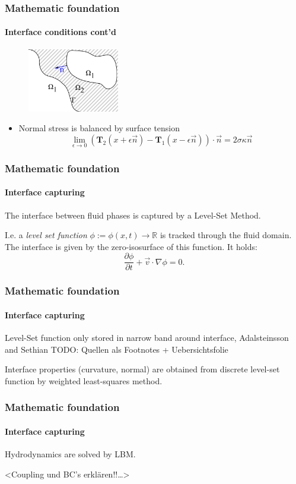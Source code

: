 \documentclass[ucs]{beamer}
\begin{document}
\begin{frame}
\frametitle{Mathematic foundation}
\framesubtitle{Interface conditions cont'd}
\begin{figure}[h!]
\includegraphics[width=4cm]{skizze.png}
\end{figure}
\begin{itemize}
\item<1->Normal stress is balanced by surface tension
  $$\lim_{\epsilon \to 0}(\textbf{T}_2(x+\epsilon \vec n) - \textbf{T}_1(x-\epsilon \vec n)) \cdot \vec n= 2\sigma \kappa \vec n$$
\end{itemize}
\vspace{-.5cm}
\end{frame}

\begin{frame}
\frametitle{Mathematic foundation}
\framesubtitle{Interface capturing}
The interface between fluid phases is captured by a Level-Set Method.

I.e. a \textit{level set function} $\phi:= \phi(x,t) \rightarrow \mathbb{R}$ is tracked through the fluid domain. The interface is given by the zero-isosurface of this function.
It holds:
$$ \frac{\partial \phi}{\partial t} + \vec v \cdot \nabla \phi = 0.$$
\end{frame}

\begin{frame}
\frametitle{Mathematic foundation}
\framesubtitle{Interface capturing}
Level-Set function only stored in narrow band around interface, Adalsteinsson and Sethian
TODO: Quellen als Footnotes + Uebersichtsfolie

Interface properties (curvature, normal) are obtained from discrete level-set function by weighted least-squares method.
\end{frame}

\begin{frame}
\frametitle{Mathematic foundation}
\framesubtitle{Interface capturing}
Hydrodynamics are solved by LBM.

<Coupling und BC's erklären!!\ldots>
\end{frame}
\end{document}
